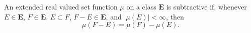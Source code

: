 An extended real valued set function $\mu$ on a class $\mathbf{E}$ is subtractive if, whenever $E \in \mathbf{E}$, $F \in \mathbf{E}$, $E \subset F$, $F - E \in \mathbf{E}$, and $|\mu(E)| < \infty$, then
$$\mu(F - E) = \mu(F) - \mu(E).$$
